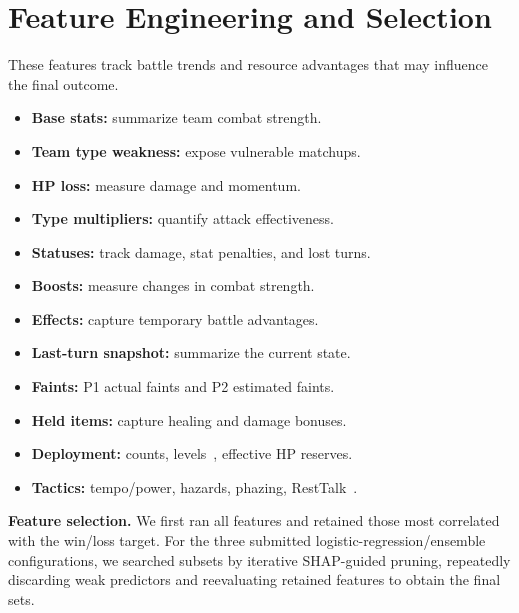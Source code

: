 \section{Feature Engineering and Selection}
\label{sec:features}

These features track battle trends and resource advantages that may influence
the final outcome.

\begin{itemize}[leftmargin=*,itemsep=0pt,parsep=0pt,topsep=2pt]
    \item \textbf{Base stats:} summarize team combat strength.
    \item \textbf{Team type weakness:} expose vulnerable matchups.
    \item \textbf{HP loss:} measure damage and momentum.
    \item \textbf{Type multipliers:} quantify attack effectiveness.
    \item \textbf{Statuses:} track damage, stat penalties, and lost turns.
    \item \textbf{Boosts:} measure changes in combat strength.
    \item \textbf{Effects:} capture temporary battle advantages.
    \item \textbf{Last-turn snapshot:} summarize the current state.
    \item \textbf{Faints:} P1 actual faints and P2 estimated faints.
    \item \textbf{Held items:} capture healing and damage bonuses.
    \item \textbf{Deployment:} counts, levels~\cite{pokemon_stat_formula}, effective HP reserves.
    \item \textbf{Tactics:} tempo/power, hazards, phazing, RestTalk~\cite{bulbapedia_metagame}.
\end{itemize}

\noindent\textbf{Feature selection.}
We first ran all features and retained those most correlated with the
win/loss target. For the three submitted logistic-regression/ensemble
configurations, we searched subsets by iterative SHAP-guided
pruning, repeatedly discarding weak predictors and reevaluating retained
features to obtain the final sets.